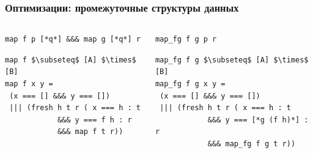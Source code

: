 \documentclass{beamer}
\begin{document}
\begin{frame}[fragile]
  \transwipe[direction=90]
  \frametitle{Оптимизации: промежуточные структуры данных}

\begin{columns}[t]
  \begin{column}{5.3cm}
\begin{badcode}
\begin{lstlisting}[frame=single]      
map f p [*q*] &&& map g [*q*] r
\end{lstlisting}

\begin{lstlisting}[frame=single]  
map f $\subseteq$ [A] $\times$ [B]
map f x y = 
 (x === [] &&& y === [])
 ||| (fresh h t r ( x === h : t 
            &&& y === f h : r
            &&& map f t r))
\end{lstlisting}
\end{badcode}
\end{column}

\pause

\begin{column}{6.1cm}
\begin{goodcode}
\begin{lstlisting}[frame=single]      
map_fg f g p r
\end{lstlisting}

\begin{lstlisting}[frame=single]  
map_fg f g $\subseteq$ [A] $\times$ [B]
map_fg f g x y = 
 (x === [] &&& y === [])
 ||| (fresh h t r ( x === h : t 
            &&& y === [*g (f h)*] : r
            &&& map_fg f g t r))
\end{lstlisting}
\end{goodcode}
\end{column}
\end{columns}
\end{frame}
\end{document}
